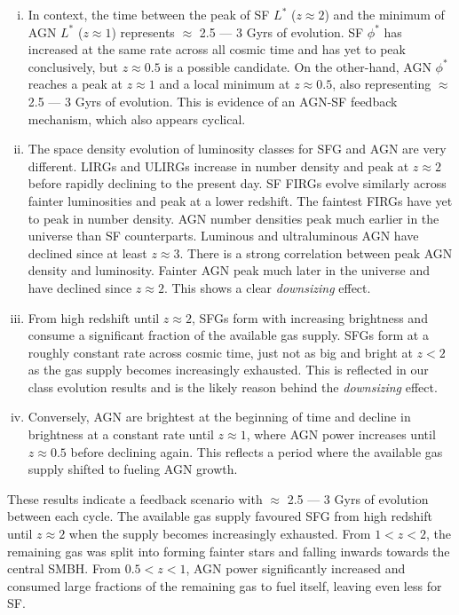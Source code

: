 \begin{enumerate}[(i)]
    \item In context, the time between the peak of SF $L^{*}$ ($z\approx2$) and the minimum of AGN $L^{*}$ ($z\approx1$) represents $\approx$ 2.5 --- 3 Gyrs of evolution. SF $\phi^{*}$ has increased at the same rate across all cosmic time and has yet to peak conclusively, but $z\approx0.5$ is a possible candidate. On the other-hand, AGN $\phi^{*}$ reaches a peak at $z\approx1$ and a local minimum at $z\approx0.5$, also representing $\approx$ 2.5 --- 3 Gyrs of evolution. This is evidence of an AGN-SF feedback mechanism, which also appears cyclical. 

    \item The space density evolution of luminosity classes for SFG and AGN are very different. LIRGs and ULIRGs increase in number density and peak at $z \approx 2$ before rapidly declining to the present day. SF FIRGs evolve similarly across fainter luminosities and peak at a lower redshift. The faintest FIRGs have yet to peak in number density. AGN number densities peak much earlier in the universe than SF counterparts. Luminous and ultraluminous AGN have declined since at least $z \approx 3$. There is a strong correlation between peak AGN density and luminosity. Fainter AGN peak much later in the universe and have declined since $z \approx 2$. This shows a clear \textit{downsizing} effect.

    \item From high redshift until $z\approx2$, SFGs form with increasing brightness and consume a significant fraction of the available gas supply. SFGs form at a roughly constant rate across cosmic time, just not as big and bright at $z<2$ as the gas supply becomes increasingly exhausted. This is reflected in our class evolution results and is the likely reason behind the \textit{downsizing} effect.

    \item Conversely, AGN are brightest at the beginning of time and decline in brightness at a constant rate until $z\approx1$, where AGN power increases until $z\approx0.5$ before declining again. This reflects a period where the available gas supply shifted to fueling AGN growth.
\end{enumerate}

These results indicate a feedback scenario with $\approx$ 2.5 --- 3 Gyrs of evolution between each cycle. The available gas supply favoured SFG from high redshift until $z\approx2$ when the supply becomes increasingly exhausted. From $1<z<2$, the remaining gas was split into forming fainter stars and falling inwards towards the central SMBH. From $0.5<z<1$, AGN power significantly increased and consumed large fractions of the remaining gas to fuel itself, leaving even less for SF. 

